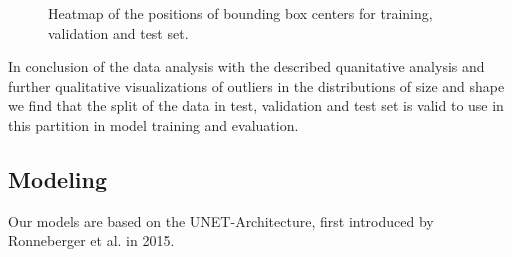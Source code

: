 \documentclass[lettersize,journal]{IEEEtran}
\begin{document}
\begin{figure}[h]
  \centering
   \quad
   \quad
  \caption{Heatmap of the positions of bounding box centers for training, validation and test set.}
  \label{fig:da_heatmaps}
\end{figure}

In conclusion of the data analysis with the described quanitative analysis and further qualitative visualizations of outliers in the distributions of size and shape we find that the split of the data in test, validation and test set is valid to use in this partition in model training and evaluation.

\subsection{Modeling}
Our models are based on the UNET-Architecture, first introduced by Ronneberger et al. in 2015.\cite[text]{ronneberger2015unetconvolutionalnetworksbiomedical}
\end{document}
